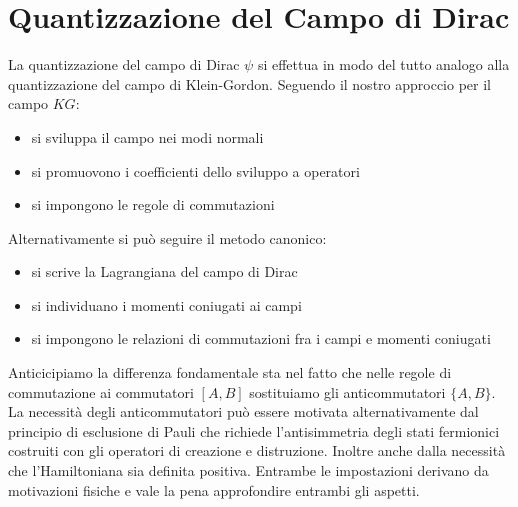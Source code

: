 \section{Quantizzazione del Campo di Dirac}
La quantizzazione del campo di Dirac $\psi$ si effettua in modo del tutto analogo alla quantizzazione del campo di Klein-Gordon. Seguendo il nostro approccio per il campo $KG$:
\begin{itemize}
    \item si sviluppa il campo nei modi normali
    \item si promuovono i coefficienti dello sviluppo a operatori
    \item si impongono le regole di commutazioni
\end{itemize}
Alternativamente si può seguire il metodo canonico:
\begin{itemize}
    \item si scrive la Lagrangiana del campo di Dirac
    \item si individuano i momenti coniugati ai campi
    \item si impongono le relazioni di commutazioni fra i campi e momenti coniugati
\end{itemize}
Anticicipiamo la differenza fondamentale sta nel fatto che nelle regole di commutazione ai commutatori $[A,B]$ sostituiamo gli anticommutatori $\{A,B\}$. La necessità degli anticommutatori può essere motivata alternativamente dal principio di esclusione di Pauli che richiede l'antisimmetria degli stati fermionici costruiti con gli operatori di creazione e distruzione. Inoltre anche dalla necessità che l'Hamiltoniana sia definita positiva. Entrambe le impostazioni derivano da motivazioni fisiche e vale la pena approfondire entrambi gli aspetti.
